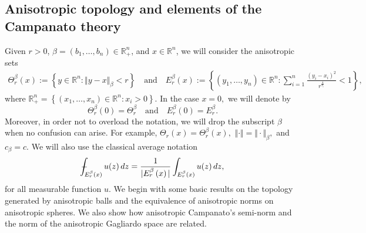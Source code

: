 \documentclass[10pt, leqno]{article}
\def\Xint#1{\mathchoice
{\XXint\displaystyle\textstyle{#1}}
{\XXint\textstyle\scriptstyle{#1}}
{\XXint\scriptstyle\scriptscriptstyle{#1}}
{\XXint\scriptscriptstyle\scriptscriptstyle{#1}}
\!\int}
\def\XXint#1#2#3{{\setbox0=\hbox{$#1{#2#3}{\int}$ }
\vcenter{\hbox{$#2#3$ }}\kern-.6\wd0}}
\def\dashint{\Xint-}
\theoremstyle{definition}
\theoremstyle{remark}
\numberwithin{equation}{section}
\begin{document}
\subsection{Anisotropic topology and elements of the Campanato theory}
Given $r > 0$, $\beta = (b_{1}, \dots, b_{n})\in \mathbb{R}^{n}_{+}$, and $x \in \mathbb{R}^{n}$, we will consider the anisotropic sets
\begin{eqnarray*}
\Theta^{\beta}_{r}\left( x \right) := \left\lbrace y \in \mathbb{R}^{n}: \Vert y - x \Vert_{\beta} < r \right\rbrace \quad \text{and} \quad E^{\beta}_{r}\left( x \right) := \left\lbrace \left( y_{1}, \dots, y_{n}\right) \in \mathbb{R}^{n} : \sum_{i=1}^{n} \frac{\left( y_{i} - x_{i} \right)^{2}}{r^{\frac{4}{b_{i}}}} < 1 \right\rbrace,
\end{eqnarray*}
where $\mathbb{R}^{n}_{+}=\left\lbrace (x_{1}, \dots, x_{n}) \in \mathbb{R}^{n}: x_{i} > 0 \right\rbrace$.
In the case $x=0,$ we will denote by
$$
\Theta^{\beta}_{r}\left( 0 \right) = \Theta^{\beta}_{r} \quad \text{and} \quad E^{\beta}_{r}\left( 0 \right) =  E^{\beta}_{r}.
$$
Moreover, in order not to overload the notation, we will drop the subscript $\beta$ when no confusion can arise. For example,  $\Theta^{}_{r}\left( x \right) = \Theta^{\beta}_{r}\left( x \right),$  $\Vert \cdot \Vert = \Vert \cdot \Vert_{\beta},$ and $c_\beta=c$.  We will also use the classical average notation
$$
\displaystyle \dashint_{E^{\beta}_{r}\left( x \right) } u(z) \, dz = \dfrac{1}{\vert E^{\beta}_{r}\left( x \right)\vert}\displaystyle \int_{E^{\beta}_{r}\left( x \right) } u(z) \, dz,
$$
for all measurable function $u$. We begin with some basic results on the topology generated by anisotropic balls and the equivalence of anisotropic norms on anisotropic spheres. We also show how anisotropic Campanato's semi-norm and the norm of the anisotropic Gagliardo space are related.
\end{document}
